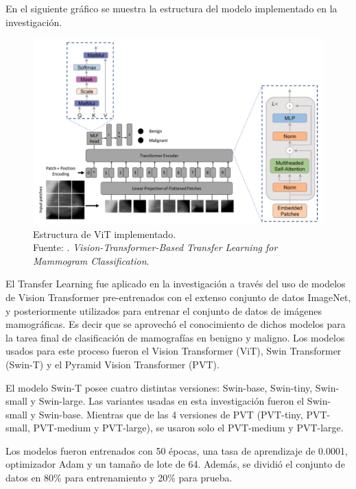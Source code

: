 En el siguiente gráfico se muestra la estructura del modelo implementado en la investigación.

\begin{figure}[H]
	\begin{center}
		\includegraphics[width=1.00\textwidth]{2/figures/vitpaper2_part2.png}
		\caption[Estructura de ViT implementado]{Estructura de ViT implementado. \\
		Fuente: \cite{pr_ayana2023ViTtrasnferLMC}. \textit{Vision-Transformer-Based Transfer Learning for Mammogram Classification}.}
		\label{2:fig109}
	\end{center}
\end{figure}

El Transfer Learning fue aplicado en la investigación a través del uso de modelos de Vision Transformer pre-entrenados con el extenso conjunto de datos ImageNet, y posteriormente utilizados para entrenar el conjunto de datos de imágenes mamográficas. Es decir que se aprovechó el conocimiento de dichos modelos para la tarea final de clasificación de mamografías en benigno y maligno. Los modelos usados para este proceso fueron el Vision Transformer (ViT), Swin Transformer (Swin-T) y el Pyramid Vision Transformer (PVT).

El modelo Swin-T posee cuatro distintas versiones: Swin-base, Swin-tiny, Swin-small y Swin-large. Las variantes usadas en esta investigación fueron el Swin-small y Swin-base. Mientras que de las 4 versiones de PVT (PVT-tiny, PVT-small, PVT-medium y PVT-large), se usaron solo el PVT-medium y PVT-large.

Los modelos fueron entrenados con 50 épocas, una tasa de aprendizaje de 0.0001, optimizador Adam y un tamaño de lote de 64. Además, se dividió el conjunto de datos en 80\% para entrenamiento y 20\% para prueba.

